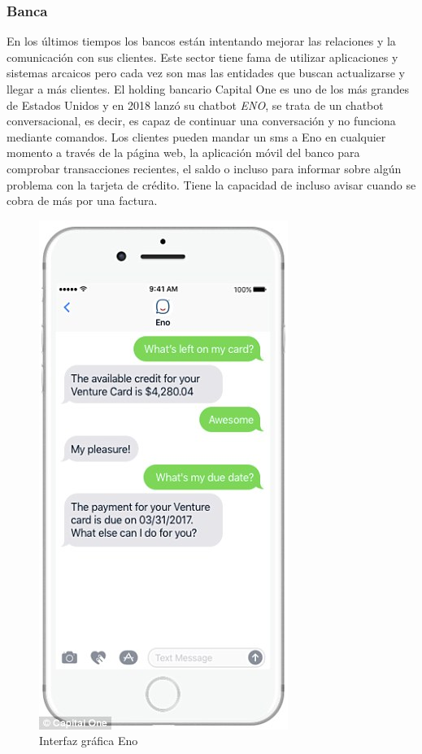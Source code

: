 \subsubsection{Banca}
En los últimos tiempos los bancos están intentando mejorar las relaciones y la comunicación con sus clientes. Este sector tiene fama de utilizar aplicaciones y sistemas arcaicos pero cada vez son mas las entidades que buscan actualizarse y llegar a más clientes. 
El holding bancario Capital One \cite{eno} es uno de los más grandes de Estados Unidos y en 2018 lanzó su chatbot \textit{ENO}, se trata de un chatbot conversacional, es decir, es capaz de continuar una conversación y no funciona mediante comandos. Los clientes pueden mandar un sms a Eno en cualquier momento a través de la página web, la aplicación móvil del banco para comprobar transacciones recientes, el saldo o incluso para informar sobre algún problema con la tarjeta de crédito. Tiene la capacidad de incluso avisar cuando se cobra de más por una factura.

\begin{figure}[h]
    \centering
    \includegraphics[scale=0.4]{include/figuras/Eno.jpg}
    \caption{Interfaz gráfica Eno}
    \label{fig:eno}
\end{figure}


